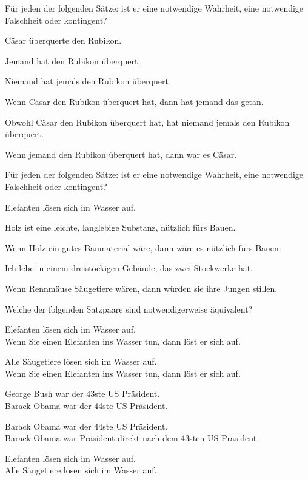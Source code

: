 \practiceproblems
\problempart
\label{pr.EnglishTautology2}
Für jeden der folgenden Sätze: ist er eine notwendige Wahrheit, eine notwendige Falschheit oder kontingent?
\begin{earg}
\item Cäsar überquerte den Rubikon.
\item Jemand hat den Rubikon überquert.
\item Niemand hat jemals den Rubikon überquert.
\item Wenn Cäsar den Rubikon überquert hat, dann hat jemand das getan.
\item Obwohl Cäsar den Rubikon überquert hat, hat niemand jemals den Rubikon überquert.
\item Wenn jemand den Rubikon überquert hat, dann war es Cäsar.
\end{earg}

\problempart
Für jeden der folgenden Sätze: ist er eine notwendige Wahrheit, eine notwendige Falschheit oder kontingent?
\begin{earg}
\item Elefanten lösen sich im Wasser auf.
\item Holz ist eine leichte, langlebige Substanz, nützlich fürs Bauen.
\item Wenn Holz ein gutes Baumaterial wäre, dann wäre es nützlich fürs Bauen.
\item Ich lebe in einem dreistöckigen Gebäude, das zwei Stockwerke hat.
\item Wenn Rennmäuse Säugetiere wären, dann würden sie ihre Jungen stillen.
\end{earg}

\problempart Welche der folgenden Satzpaare sind notwendigerweise äquivalent?

\begin{earg}
\item Elefanten lösen sich im Wasser auf.	\\
	Wenn Sie einen Elefanten ins Wasser tun, dann löst er sich auf.
\item Alle Säugetiere lösen sich im Wasser auf.\\		
	Wenn Sie einen Elefanten ins Wasser tun, dann löst er sich auf.
\item George Bush war der 43ste US Präsident. \\
	 Barack Obama war der 44ste US Präsident. 
\item Barack Obama war der 44ste US Präsident. \\
	  Barack Obama war Präsident direkt nach dem 43sten US Präsident. 
\item Elefanten lösen sich im Wasser auf. 	\\	
	Alle Säugetiere lösen sich im Wasser auf.
\end{earg}


